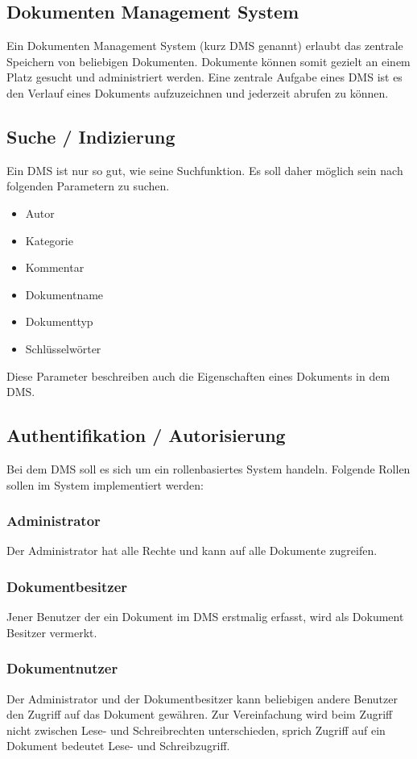 \documentclass[11pt, a4paper]{article}
\begin{document}
\subsection*{Dokumenten Management System}

Ein Dokumenten Management System (kurz DMS genannt) erlaubt das zentrale Speichern von beliebigen Dokumenten. Dokumente können somit gezielt an einem Platz gesucht und administriert werden. Eine zentrale Aufgabe eines DMS ist es den Verlauf eines Dokuments aufzuzeichnen und jederzeit abrufen zu können.

\subsection*{Suche / Indizierung}

Ein DMS ist nur so gut, wie seine Suchfunktion. Es soll daher möglich sein nach folgenden Parametern zu suchen.

\begin{itemize}
\item Autor
\item Kategorie
\item Kommentar
\item Dokumentname
\item Dokumenttyp
\item Schlüsselwörter
\end{itemize}
Diese Parameter beschreiben auch die Eigenschaften eines Dokuments in dem DMS.

\subsection*{Authentifikation / Autorisierung}

Bei dem DMS soll es sich um ein rollenbasiertes System handeln. Folgende Rollen sollen im System implementiert werden:

\subsubsection*{Administrator}
Der Administrator hat alle Rechte und kann auf alle Dokumente zugreifen.

\subsubsection*{Dokumentbesitzer}
Jener Benutzer der ein Dokument im DMS erstmalig erfasst, wird als Dokument Besitzer vermerkt.

\subsubsection*{Dokumentnutzer}
Der Administrator und der Dokumentbesitzer kann beliebigen andere Benutzer den Zugriff auf das Dokument gewähren.
Zur Vereinfachung wird beim Zugriff nicht zwischen Lese- und Schreibrechten unterschieden, sprich Zugriff auf ein Dokument bedeutet Lese- und Schreibzugriff.
\end{document}

